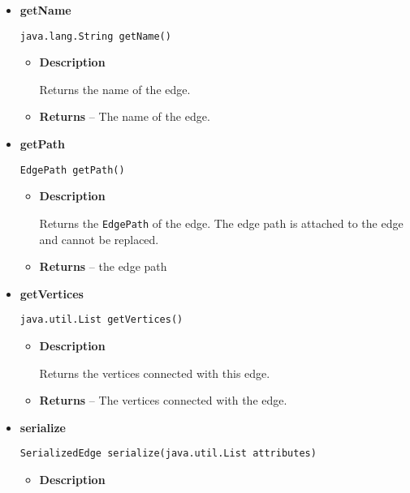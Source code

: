{{{{{{\begin{itemize}
{\begin{itemize}
{Returns the label of the edge.
}
\item{{\bf  Returns} -- 
The label of the edge. 
}%
\end{itemize}
}%
\item{ 
{\bf  getName}\\
\begin{lstlisting}[frame=none]
java.lang.String getName()\end{lstlisting} %
\begin{itemize}
\item{
{\bf  Description}

Returns the name of the edge.
}
\item{{\bf  Returns} -- 
The name of the edge. 
}%
\end{itemize}
}%
\item{ 
{\bf  getPath}\\
\begin{lstlisting}[frame=none]
EdgePath getPath()\end{lstlisting} %
\begin{itemize}
\item{
{\bf  Description}

Returns the \texttt{\small EdgePath}{\small 
{}} of the edge. The edge path is attached to the edge and cannot be replaced.
}
\item{{\bf  Returns} -- 
the edge path 
}%
\end{itemize}
}%
\item{ 
{\bf  getVertices}\\
\begin{lstlisting}[frame=none]
java.util.List getVertices()\end{lstlisting} %
\begin{itemize}
\item{
{\bf  Description}

Returns the vertices connected with this edge.
}
\item{{\bf  Returns} -- 
The vertices connected with the edge. 
}%
\end{itemize}
}%
\item{ 
{\bf  serialize}\\
\begin{lstlisting}[frame=none]
SerializedEdge serialize(java.util.List attributes)\end{lstlisting} %
\begin{itemize}
\item{
{\bf  Description}

}
\end{itemize}}
\end{itemize}}}}}}}
